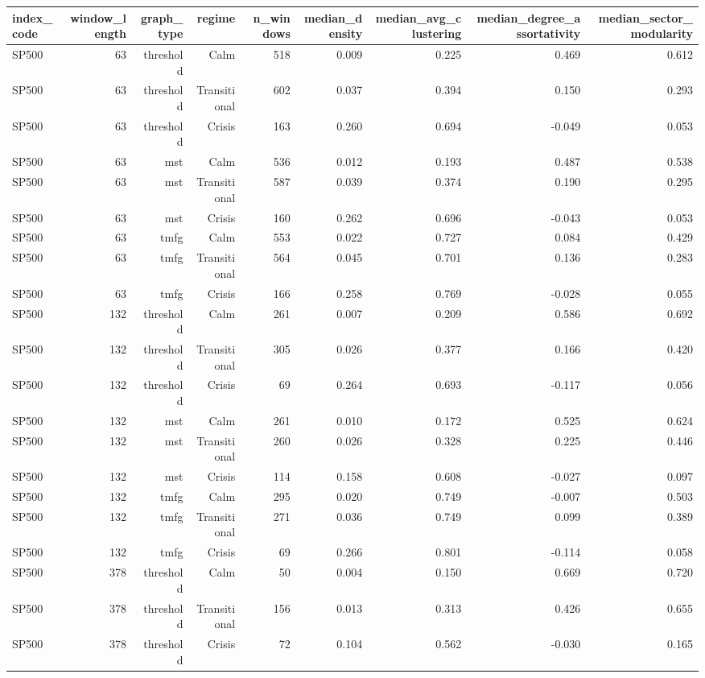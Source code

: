\begin{tabular}{lrrrrrrrr}
\toprule
index\_code & window\_length & graph\_type & regime & n\_windows & median\_density & median\_avg\_clustering & median\_degree\_assortativity & median\_sector\_modularity \\
\midrule
SP500 & 63 & threshold & Calm & 518 & 0.009 & 0.225 & 0.469 & 0.612 \\
SP500 & 63 & threshold & Transitional & 602 & 0.037 & 0.394 & 0.150 & 0.293 \\
SP500 & 63 & threshold & Crisis & 163 & 0.260 & 0.694 & -0.049 & 0.053 \\
SP500 & 63 & mst & Calm & 536 & 0.012 & 0.193 & 0.487 & 0.538 \\
SP500 & 63 & mst & Transitional & 587 & 0.039 & 0.374 & 0.190 & 0.295 \\
SP500 & 63 & mst & Crisis & 160 & 0.262 & 0.696 & -0.043 & 0.053 \\
SP500 & 63 & tmfg & Calm & 553 & 0.022 & 0.727 & 0.084 & 0.429 \\
SP500 & 63 & tmfg & Transitional & 564 & 0.045 & 0.701 & 0.136 & 0.283 \\
SP500 & 63 & tmfg & Crisis & 166 & 0.258 & 0.769 & -0.028 & 0.055 \\
SP500 & 132 & threshold & Calm & 261 & 0.007 & 0.209 & 0.586 & 0.692 \\
SP500 & 132 & threshold & Transitional & 305 & 0.026 & 0.377 & 0.166 & 0.420 \\
SP500 & 132 & threshold & Crisis & 69 & 0.264 & 0.693 & -0.117 & 0.056 \\
SP500 & 132 & mst & Calm & 261 & 0.010 & 0.172 & 0.525 & 0.624 \\
SP500 & 132 & mst & Transitional & 260 & 0.026 & 0.328 & 0.225 & 0.446 \\
SP500 & 132 & mst & Crisis & 114 & 0.158 & 0.608 & -0.027 & 0.097 \\
SP500 & 132 & tmfg & Calm & 295 & 0.020 & 0.749 & -0.007 & 0.503 \\
SP500 & 132 & tmfg & Transitional & 271 & 0.036 & 0.749 & 0.099 & 0.389 \\
SP500 & 132 & tmfg & Crisis & 69 & 0.266 & 0.801 & -0.114 & 0.058 \\
SP500 & 378 & threshold & Calm & 50 & 0.004 & 0.150 & 0.669 & 0.720 \\
SP500 & 378 & threshold & Transitional & 156 & 0.013 & 0.313 & 0.426 & 0.655 \\
SP500 & 378 & threshold & Crisis & 72 & 0.104 & 0.562 & -0.030 & 0.165 \\

\end{tabular}
